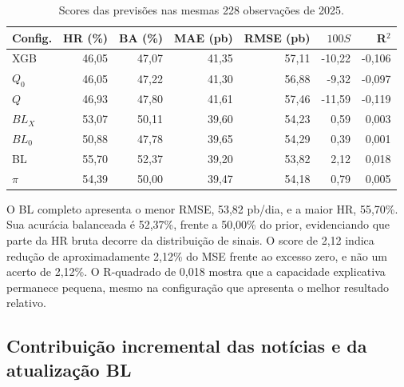 \begin{table}[H]\centering
\caption{Scores das previsões nas mesmas 228 observações de 2025.}
\label{tab:scores_camadas}
{\footnotesize\setlength{\tabcolsep}{4pt}\begin{tabular}{lrrrrrr}\hline
Config. & HR (\%) & BA (\%) & MAE (pb) & RMSE (pb) & $100S$ & R$^2$\\ \hline
XGB & 46,05 & 47,07 & 41,35 & 57,11 & -10,22 & -0,106\\
$Q_0$ & 46,05 & 47,22 & 41,30 & 56,88 & -9,32 & -0,097\\
$Q$ & 46,93 & 47,80 & 41,61 & 57,46 & -11,59 & -0,119\\
$BL_X$ & 53,07 & 50,11 & 39,60 & 54,23 & 0,59 & 0,003\\
$BL_0$ & 50,88 & 47,78 & 39,65 & 54,29 & 0,39 & 0,001\\
BL & 55,70 & 52,37 & 39,20 & 53,82 & 2,12 & 0,018\\
$\pi$ & 54,39 & 50,00 & 39,47 & 54,18 & 0,79 & 0,005\\
\hline\end{tabular}}
\par{}
\end{table}

O BL completo apresenta o menor RMSE, 53,82 pb/dia, e a maior HR, 55,70\%. Sua acurácia balanceada é 52,37\%, frente a 50,00\% do prior, evidenciando que parte da HR bruta decorre da distribuição de sinais. O score de 2,12 indica redução de aproximadamente 2,12\% do MSE frente ao excesso zero, e não um acerto de 2,12\%. O R-quadrado de 0,018 mostra que a capacidade explicativa permanece pequena, mesmo na configuração que apresenta o melhor resultado relativo.

\subsection{Contribuição incremental das notícias e da atualização BL}

